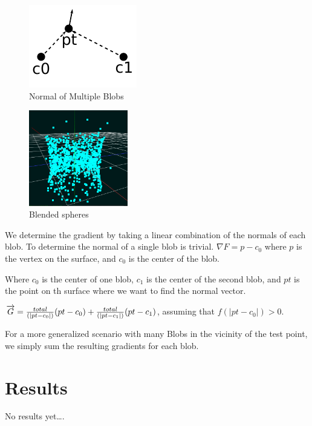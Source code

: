 \documentclass[conference]{acmsiggraph}
\begin{document}
\begin{figure}
	\centering
	\includegraphics{images/Normal.pdf}
	\caption{Normal of Multiple Blobs}
\end{figure}


\begin{figure}
	\centering
	\includegraphics[width=1.7in]{images/SpheresBlending.png}
	\caption{Blended spheres}
\end{figure}






We determine the gradient by taking a linear combination of the normals of each
blob. To determine the normal of a single blob is trivial. $\nabla F = p - c_0$
where $p$ is the vertex on the surface, and $c_0$ is the center of the
blob. 



Where $c_0$ is the center of one blob, $c_1$ is the center of the second blob,
and $pt$ is the point on th surface where we want to find the normal vector.

$\overrightarrow{G} = {total\over (|pt - c_0|)}(pt - c_0) + {total\over (|pt -
c_1|)}(pt - c_1)$, assuming that $f(|pt - c_0|) > 0$.

For a more generalized scenario with many Blobs in the vicinity of the test
point, we simply sum the resulting gradients for each blob.






\section{Results}
No results yet\ldots.
\end{document}
